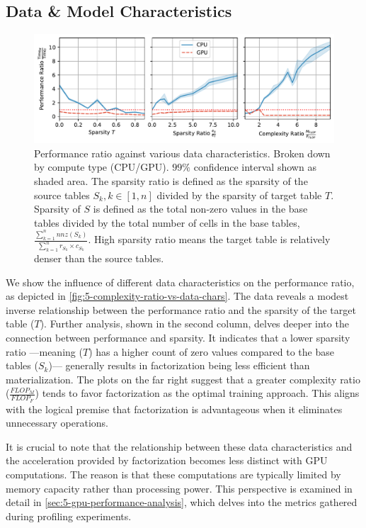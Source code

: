 \subsection{Data \& Model Characteristics}
\begin{figure}[ht]
    \centering
    \includegraphics[width=\linewidth]{chapters/05_cost_estimation/figures/motivation_perf_ratio_vs_data_chars.pdf}
    \caption[Performance ratio for various data characteristics]{Performance ratio against various data characteristics. Broken down by compute type (CPU/GPU). $99\%$ confidence interval shown as shaded area. The sparsity ratio is defined as the sparsity of the source tables $S_k, k\in[1,n]$ divided by the sparsity of target table $T$. Sparsity of $S$ is defined as the total non-zero values in the base tables divided by the total number of cells in the base tables, $\frac{\sum_{k=1}^{n} nnz(S_k)}{\sum_{k=1}^{n} r_{S_k} \times c_{S_k}}$. High sparsity ratio means the target table is relatively denser than the source tables.}
    \label{fig:5-complexity-ratio-vs-data-chars}
\end{figure}
We show the influence of different data characteristics on the performance ratio, as depicted in \autoref{fig:5-complexity-ratio-vs-data-chars}. The data reveals a modest inverse relationship between the performance ratio and the sparsity of the target table ($T$). Further analysis, shown in the second column, delves deeper into the connection between performance and sparsity. It indicates that a lower sparsity ratio —meaning ($T$) has a higher count of zero values compared to the base tables ($S_k$)— generally results in factorization being less efficient than materialization. The plots on the far right suggest that a greater complexity ratio ($\frac{FLOP_M}{FLOP_F}$) tends to favor factorization as the optimal training approach. This aligns with the logical premise that factorization is advantageous when it eliminates unnecessary operations.

It is crucial to note that the relationship between these data characteristics and the acceleration provided by factorization becomes less distinct with GPU computations. The reason is that these computations are typically limited by memory capacity rather than processing power. This perspective is examined in detail in \autoref{sec:5-gpu-performance-analysis}, which delves into the metrics gathered during profiling experiments.

